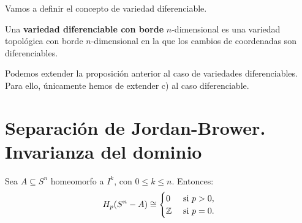 Vamos a definir el concepto de variedad diferenciable.

\begin{definition}
  Una \textbf{variedad diferenciable con borde} $n$-dimensional es una variedad topológica con borde $n$-dimensional en la que
  los cambios de coordenadas son diferenciables.
\end{definition}

\begin{remark}
  Podemos extender la proposición anterior al caso de variedades diferenciables. Para ello, únicamente hemos de extender
  c) al caso diferenciable.
\end{remark}

\section{Separación de Jordan-Brower. Invarianza del dominio}

\begin{proposition}
  Sea $A \subseteq S^n$ homeomorfo a $I^k$, con $0 \leq k \leq n$. Entonces:
  \[ H_p(S^n - A) \cong \begin{cases} 0 &\text{ si } p > 0, \\ \mathbb{Z} &\text{ si } p = 0. \end{cases} \]
\end{proposition}

